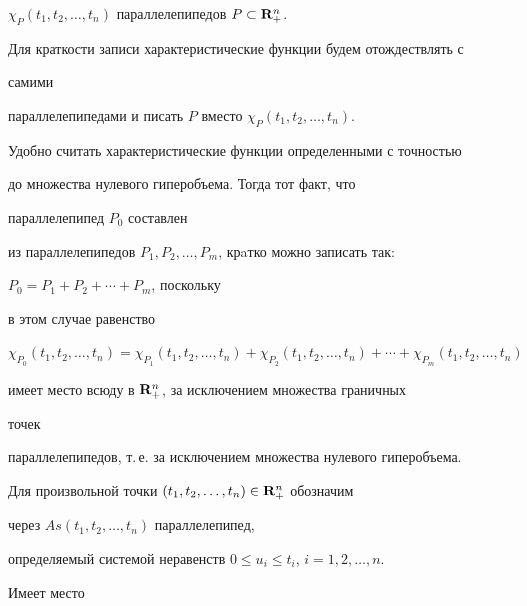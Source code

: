 $\chi_P(t_1,t_2,\dotsc,t_n)$ параллелепипедов $P\subset\bold R^n_+$. 


Для краткости записи характеристические функции будем отождествлять с 


самими  


параллелепипедами и писать $P$ вместо $\chi_P(t_1,t_2,\dotsc,t_n)$. 


 


Удобно считать характеристические функции определенными с точностью  


до множества нулевого гиперобъема. Тогда тот факт, что  


параллелепипед $P_0$ составлен  


из параллелепипедов $P_1,P_2,\dotsc,P_m$, крaтко можно записать так: 


$P_0=P_1+P_2+\dotsb+P_m$, поскольку  


в этом случае равенство 


$\chi_{P_0}(t_1,t_2,\dotsc,t_n)=\chi_{P_1}(t_1,t_2,\dotsc,t_n)+ 


\chi_{P_2}(t_1,t_2,\dotsc,t_n)+\dotsb+\chi_{P_m}(t_1,t_2,\dotsc,t_n)$ 


имеет место всюду в $\bold R^n_+$, за исключением множества граничных 


точек  


параллелепипедов, т.\,е. за исключением множества нулевого гиперобъема.  


 


Для произвольной точки $(t_1,t_2,\dotsc,t_n)\in\bold R^n_+$ обозначим 


через $As(t_1,t_2,\dotsc,t_n)$ параллелепипед,  


определяемый системой неравенств $0\le u_i\le t_i$, $i=1,2,\dotsc,n$. 


Имеет место  


\medskip 


 


